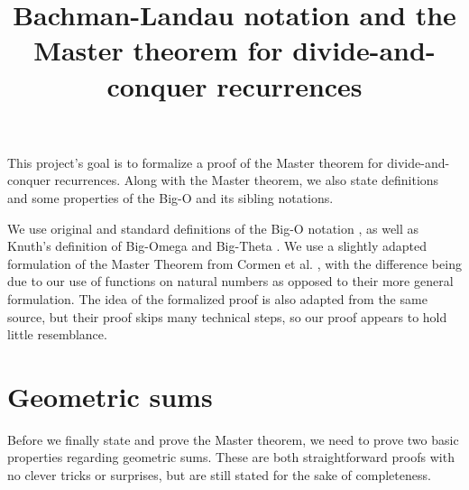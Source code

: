 




\title{Bachman-Landau notation and the Master theorem for 
        divide-and-conquer recurrences}

This project's goal is to formalize a proof of the Master theorem for 
divide-and-conquer recurrences. Along with the Master theorem, we also
state definitions and some properties of the Big-O and its sibling notations.

We use original and standard definitions of the Big-O notation 
\cite{bachmann1894, landau1909, sipser1996}, as well as Knuth's definition of 
Big-Omega and Big-Theta \cite{knuth1976}. We use a slightly adapted formulation 
of the Master Theorem from Cormen et al. \cite{cormen2022}, with the difference 
being due to our use of functions on natural numbers as opposed to their
more general formulation. The idea of the formalized proof is also adapted
from the same source, but their proof skips many technical steps, so our
proof appears to hold little resemblance.














\chapter{Geometric sums}

Before we finally state and prove the Master theorem, we need to prove two
basic properties regarding geometric sums. These are both straightforward 
proofs with no clever tricks or surprises, but are still stated for the sake 
of completeness.

